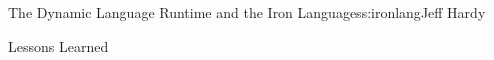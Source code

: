 \begin{aosachapter}{The Dynamic Language Runtime and the Iron Languages}{s:ironlang}{Jeff Hardy}
\begin{aosasect1}{Lessons Learned}
\end{aosasect1}

\end{aosachapter}
